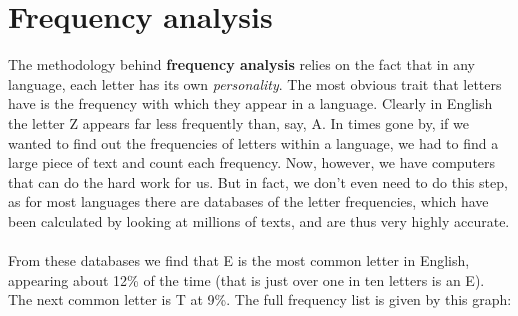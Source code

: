 \documentclass[Lau,binding=0.6cm,oneside]{sapthesis}
\begin{document}
\section{Frequency analysis}
The methodology behind \textbf{frequency analysis} relies on the fact that in any language, each letter has its own \textit{personality}. The most obvious trait that letters have is the frequency with which they appear in a language. Clearly in English the letter Z appears far less frequently than, say, A. In times gone by, if we wanted to find out the frequencies of letters within a language, we had to find a large piece of text and count each frequency. Now, however, we have computers that can do the hard work for us. But in fact, we don't even need to do this step, as for most languages there are databases of the letter frequencies, which have been calculated by looking at millions of texts, and are thus very highly accurate.\\\\
From these databases we find that \textsf{E} is the most common letter in English, appearing about 12\% of the time (that is just over one in ten letters is an \textsf{E}). The next common letter is \textsf{T} at 9\%. The full frequency list is given by this graph:\\\\
\end{document}
